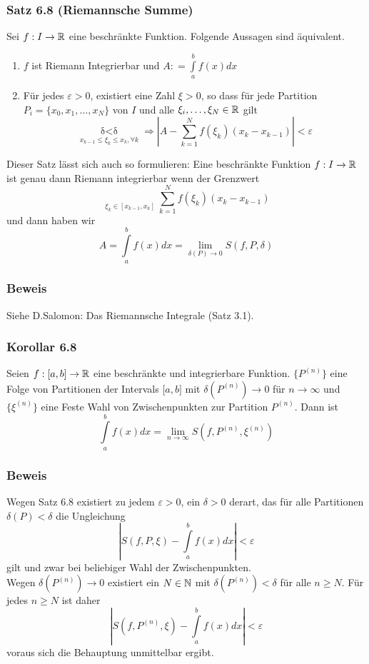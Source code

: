 \subsubsection*{Satz 6.8 (Riemannsche Summe)}
Sei $f:I\to \mathbb{R}$ eine beschränkte Funktion. Folgende Aussagen sind äquivalent.
\begin{enumerate}[\indent I)]
\item $f$ ist Riemann Integrierbar und $A: = \int\limits_a^b {f(x)dx} $
\item Für jedes $\varepsilon>0$, existiert eine Zahl $\xi>0$, so dass für jede Partition $P_i=\{x_0,x_1,\dots,x_N\}$ von $I$ und alle $\xi_i,\dots,\xi_N \in \mathbb{R}$ gilt \[\mathop {\delta (P) < \delta }\limits_{{x_{k - 1}} \le {\xi _k} \le {x_k},\forall k}  \Rightarrow \left| {A - \sum\limits_{k = 1}^N {f({\xi _k})({x_k} - {x_{k - 1}})} } \right| < \varepsilon \]
\end{enumerate}
Dieser Satz lässt sich auch so formulieren: Eine beschränkte Funktion $f:I\to\mathbb{R}$ ist genau dann Riemann integrierbar wenn der Grenzwert \[\mathop {\mathop {\lim }\limits_{\delta (P) \to 0} }\limits_{{\xi _k} \in [{x_{k - 1}},{x_k}]} \sum\limits_{k = 1}^N {f({\xi _k})({x_k} - {x_{k - 1}})} \] und dann haben wir \[A=\int\limits_a^b {f(x)dx = \mathop {\lim }\limits_{\delta (P) \to 0} } S(f,P,\delta )\]

\subsubsection*{Beweis} Siehe D.Salomon: Das Riemannsche Integrale (Satz 3.1).
\subsubsection*{Korollar 6.8}
Seien $f:\lbrack a,b\rbrack\to\mathbb{R}$ eine beschränkte und integrierbare Funktion. $\{ P^{(n)}\}$ eine Folge von Partitionen der Intervals $\lbrack a,b\rbrack$ mit $\delta(P^{(n)})\to 0$ für $n\to\infty$ und $\{\xi^{(n)}\}$ eine Feste Wahl von Zwischenpunkten zur Partition $P^{(n)}$. Dann ist
\[\int\limits_a^b {f(x)dx = \mathop {\lim }\limits_{n \to \infty } S(f,{P^{(n)}},{\xi ^{(n)}})} \]
\subsubsection*{Beweis}
Wegen Satz 6.8 existiert zu jedem $\varepsilon>0$, ein $\delta>0$ derart, das für alle Partitionen $\delta(P)<\delta$ die Ungleichung 
\[\left| {S(f,P,\xi ) - \int\limits_a^b {f(x)dx} } \right| < \varepsilon \]
gilt und zwar bei beliebiger Wahl der Zwischenpunkten.\\
Wegen  $\delta(P^{(n)})\to 0$ existiert ein $N\in\mathbb{N}$ mit $\delta(P^{(n)})<\delta$ für alle $n\geq N$.
Für jedes $n\geq N$ ist daher \[\left| {S(f,{P^{(n)}},\xi ) - \int\limits_a^b {f(x)dx} } \right| < \varepsilon \] voraus sich die Behauptung unmittelbar ergibt. 
